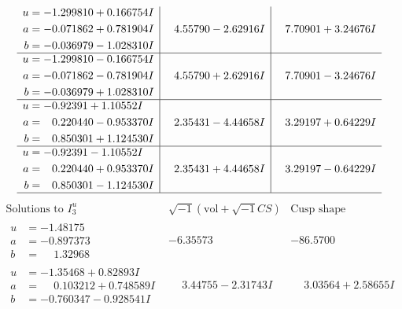 \documentclass[1p]{elsarticle_modified}
\theoremstyle{definition}
\newcommand{\I}{\sqrt{-1}}
\begin{document}
$$\begin{array}{c|c|c}
\begin{aligned}
u &= -1.299810 + 0.166754 I \\
a &= -0.071862 + 0.781904 I \\
b &= -0.036979 - 1.028310 I\end{aligned}
 & \phantom{-}4.55790 - 2.62916 I & \phantom{-}7.70901 + 3.24676 I \\ \hline\begin{aligned}
u &= -1.299810 - 0.166754 I \\
a &= -0.071862 - 0.781904 I \\
b &= -0.036979 + 1.028310 I\end{aligned}
 & \phantom{-}4.55790 + 2.62916 I & \phantom{-}7.70901 - 3.24676 I \\ \hline\begin{aligned}
u &= -0.92391 + 1.10552 I \\
a &= \phantom{-}0.220440 - 0.953370 I \\
b &= \phantom{-}0.850301 + 1.124530 I\end{aligned}
 & \phantom{-}2.35431 - 4.44658 I & \phantom{-}3.29197 + 0.64229 I \\ \hline\begin{aligned}
u &= -0.92391 - 1.10552 I \\
a &= \phantom{-}0.220440 + 0.953370 I \\
b &= \phantom{-}0.850301 - 1.124530 I\end{aligned}
 & \phantom{-}2.35431 + 4.44658 I & \phantom{-}3.29197 - 0.64229 I\\
 \hline 
 \end{array}$$\newpage$$\begin{array}{c|c|c}  
\text{Solutions to }I^u_{3}& \I (\text{vol} + \sqrt{-1}CS) & \text{Cusp shape}\\
 \hline 
\begin{aligned}
u &= -1.48175\phantom{ +0.000000I} \\
a &= -0.897373\phantom{ +0.000000I} \\
b &= \phantom{-}1.32968\phantom{ +0.000000I}\end{aligned}
 & -6.35573\phantom{ +0.000000I} & -86.5700\phantom{ +0.000000I} \\ \hline\begin{aligned}
u &= -1.35468 + 0.82893 I \\
a &= \phantom{-}0.103212 + 0.748589 I \\
b &= -0.760347 - 0.928541 I\end{aligned}
 & \phantom{-}3.44755 - 2.31743 I & \phantom{-}3.03564 + 2.58655 I \\ \hline\begin{aligned}

\end{aligned}
\end{array}$$
\end{document}

